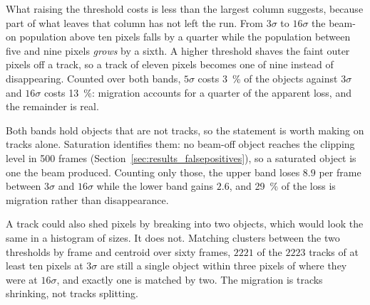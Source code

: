 \documentclass[a4paper,headsepline,oneside,11pt]{scrartcl}
\begin{document}
What raising the threshold costs is less than the largest column suggests,
because part of what leaves that column has not left the run. From $3\sigma$ to
$16\sigma$ the beam-on population above ten pixels falls by a quarter while the
population between five and nine pixels \emph{grows} by a sixth. A higher
threshold shaves the faint outer pixels off a track, so a track of eleven pixels
becomes one of nine instead of disappearing. Counted over both bands, $5\sigma$
costs \SI{3}{\percent} of the objects against $3\sigma$ and $16\sigma$ costs
\SI{13}{\percent}: migration accounts for a quarter of the apparent loss, and
the remainder is real.

Both bands hold objects that are not tracks, so the statement is worth making on
tracks alone. Saturation identifies them: no beam-off object reaches the
clipping level in 500 frames (Section~\ref{sec:results_falsepositives}), so a
saturated object is one the beam produced. Counting only those, the upper band
loses $8.9$ per frame between $3\sigma$ and $16\sigma$ while the lower band gains
$2.6$, and \SI{29}{\percent} of the loss is migration rather than
disappearance.

A track could also shed pixels by breaking into two objects, which would look
the same in a histogram of sizes. It does not. Matching clusters between the two
thresholds by frame and centroid over sixty frames, $2221$ of the $2223$ tracks
of at least ten pixels at $3\sigma$ are still a single object within three
pixels of where they were at $16\sigma$, and exactly one is matched by two. The
migration is tracks shrinking, not tracks splitting.
\end{document}
